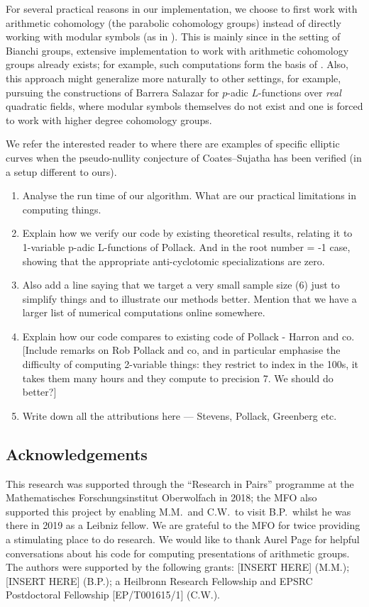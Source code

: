 \documentclass[a4paper,11pt]{article}
\numberwithin{equation}{section}
\begin{document}
For several practical reasons in our implementation, we choose to first work with arithmetic cohomology (the parabolic cohomology groups) instead of directly working with modular symbols (as in \cite{PS11,Gre07}). This is mainly since in the setting of Bianchi groups, extensive implementation to work with arithmetic cohomology groups already exists; for example, such computations form the basis of \cite{GMS15}. Also, this approach might generalize more naturally to other settings, for example, pursuing the constructions of Barrera Salazar \cite{Bar15} for $p$-adic $L$-functions over \emph{real} quadratic fields, where modular symbols themselves do not exist and one is forced to work with higher degree cohomology groups.

We refer the interested reader to \cite{MR2287113,MR2830442,MR2916368,MR3440445,MR3810684} where there are examples of specific elliptic curves when the pseudo-nullity conjecture of Coates--Sujatha has been verified (in a setup different to ours).

\begin{enumerate}
\item Analyse the run time of our algorithm. What are our practical limitations in computing things.
\item Explain how we verify our code by existing theoretical results, relating it to 1-variable p-adic L-functions of Pollack. And in the root number = -1 case, showing that the appropriate anti-cyclotomic specializations are zero.
\item Also add a line saying that we target a very small sample size (6) just to simplify things and to illustrate our methods better. Mention that we have a larger list of numerical computations online somewhere.
\item Explain how our code compares to existing code of Pollack - Harron and co.
[Include remarks on Rob Pollack and co, and in particular emphasise the difficulty of computing 2-variable things: they restrict to index in the 100s, it takes them many hours and they compute to precision 7. We should do better?]
\item Write down all the attributions here --- Stevens, Pollack, Greenberg etc.
\end{enumerate}



\subsection*{Acknowledgements}
This research was supported through the ``Research in Pairs'' programme at the Mathematisches Forschungsinstitut Oberwolfach in 2018; the MFO also supported this project by enabling M.M.\ and C.W.\ to visit B.P.\ whilst he was there in 2019 as a Leibniz fellow. We are grateful to the MFO for twice providing a stimulating place to do research. We would like to thank Aurel Page for helpful conversations about his code for computing presentations of arithmetic groups. The authors were supported by the following grants: [INSERT HERE] (M.M.); [INSERT HERE] (B.P.); a Heilbronn Research Fellowship and EPSRC Postdoctoral Fellowship [EP/T001615/1] (C.W.).
\end{document}

